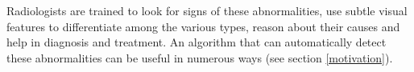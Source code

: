 \documentclass[12pt,twoside,a4paper]{report}
\begin{document}
Radiologists are trained to look for signs of these abnormalities, use subtle
visual features to differentiate among the various types, reason about their
causes and help in diagnosis and treatment. An algorithm that can automatically
detect these abnormalities can be useful in numerous ways (see section
\ref{motivation}).\\
\end{document}
